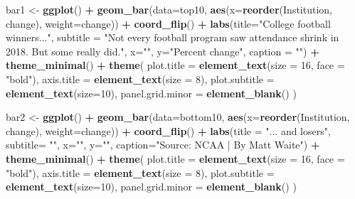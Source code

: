 \documentclass[]{book}
\newenvironment{Shaded}{\begin{snugshade}}{\end{snugshade}}
\newcommand{\DataTypeTok}[1]{\textcolor[rgb]{0.13,0.29,0.53}{#1}}
\newcommand{\DecValTok}[1]{\textcolor[rgb]{0.00,0.00,0.81}{#1}}
\newcommand{\KeywordTok}[1]{\textcolor[rgb]{0.13,0.29,0.53}{\textbf{#1}}}
\newcommand{\NormalTok}[1]{#1}
\newcommand{\OperatorTok}[1]{\textcolor[rgb]{0.81,0.36,0.00}{\textbf{#1}}}
\newcommand{\StringTok}[1]{\textcolor[rgb]{0.31,0.60,0.02}{#1}}
\begin{document}
\begin{Shaded}
\begin{Highlighting}[]
\NormalTok{bar1 <-}\StringTok{ }\KeywordTok{ggplot}\NormalTok{() }\OperatorTok{+}\StringTok{ }\KeywordTok{geom_bar}\NormalTok{(}\DataTypeTok{data=}\NormalTok{top10, }\KeywordTok{aes}\NormalTok{(}\DataTypeTok{x=}\KeywordTok{reorder}\NormalTok{(Institution, change), }\DataTypeTok{weight=}\NormalTok{change)) }\OperatorTok{+}\StringTok{ }\KeywordTok{coord_flip}\NormalTok{() }\OperatorTok{+}\StringTok{ }\KeywordTok{labs}\NormalTok{(}\DataTypeTok{title=}\StringTok{"College football winners..."}\NormalTok{, }\DataTypeTok{subtitle =} \StringTok{"Not every football program saw attendance shrink in 2018. But some really did."}\NormalTok{,  }\DataTypeTok{x=}\StringTok{""}\NormalTok{, }\DataTypeTok{y=}\StringTok{"Percent change"}\NormalTok{, }\DataTypeTok{caption =} \StringTok{""}\NormalTok{) }\OperatorTok{+}\StringTok{ }\KeywordTok{theme_minimal}\NormalTok{() }\OperatorTok{+}\StringTok{ }
\StringTok{  }\KeywordTok{theme}\NormalTok{(}
    \DataTypeTok{plot.title =} \KeywordTok{element_text}\NormalTok{(}\DataTypeTok{size =} \DecValTok{16}\NormalTok{, }\DataTypeTok{face =} \StringTok{"bold"}\NormalTok{),}
    \DataTypeTok{axis.title =} \KeywordTok{element_text}\NormalTok{(}\DataTypeTok{size =} \DecValTok{8}\NormalTok{), }
    \DataTypeTok{plot.subtitle =} \KeywordTok{element_text}\NormalTok{(}\DataTypeTok{size=}\DecValTok{10}\NormalTok{), }
    \DataTypeTok{panel.grid.minor =} \KeywordTok{element_blank}\NormalTok{()}
\NormalTok{    )}
\end{Highlighting}
\end{Shaded}

\begin{Shaded}
\begin{Highlighting}[]
\NormalTok{bar2 <-}\StringTok{ }\KeywordTok{ggplot}\NormalTok{() }\OperatorTok{+}\StringTok{ }\KeywordTok{geom_bar}\NormalTok{(}\DataTypeTok{data=}\NormalTok{bottom10, }\KeywordTok{aes}\NormalTok{(}\DataTypeTok{x=}\KeywordTok{reorder}\NormalTok{(Institution, change), }\DataTypeTok{weight=}\NormalTok{change)) }\OperatorTok{+}\StringTok{ }\KeywordTok{coord_flip}\NormalTok{() }\OperatorTok{+}\StringTok{  }\KeywordTok{labs}\NormalTok{(}\DataTypeTok{title =} \StringTok{"... and losers"}\NormalTok{, }\DataTypeTok{subtitle=} \StringTok{""}\NormalTok{, }\DataTypeTok{x=}\StringTok{""}\NormalTok{, }\DataTypeTok{y=}\StringTok{""}\NormalTok{,  }\DataTypeTok{caption=}\StringTok{"Source: NCAA | By Matt Waite"}\NormalTok{) }\OperatorTok{+}\StringTok{ }\KeywordTok{theme_minimal}\NormalTok{() }\OperatorTok{+}\StringTok{ }
\StringTok{  }\KeywordTok{theme}\NormalTok{(}
    \DataTypeTok{plot.title =} \KeywordTok{element_text}\NormalTok{(}\DataTypeTok{size =} \DecValTok{16}\NormalTok{, }\DataTypeTok{face =} \StringTok{"bold"}\NormalTok{),}
    \DataTypeTok{axis.title =} \KeywordTok{element_text}\NormalTok{(}\DataTypeTok{size =} \DecValTok{8}\NormalTok{), }
    \DataTypeTok{plot.subtitle =} \KeywordTok{element_text}\NormalTok{(}\DataTypeTok{size=}\DecValTok{10}\NormalTok{), }
    \DataTypeTok{panel.grid.minor =} \KeywordTok{element_blank}\NormalTok{()}
\NormalTok{    )}
\end{Highlighting}
\end{Shaded}
\end{document}
